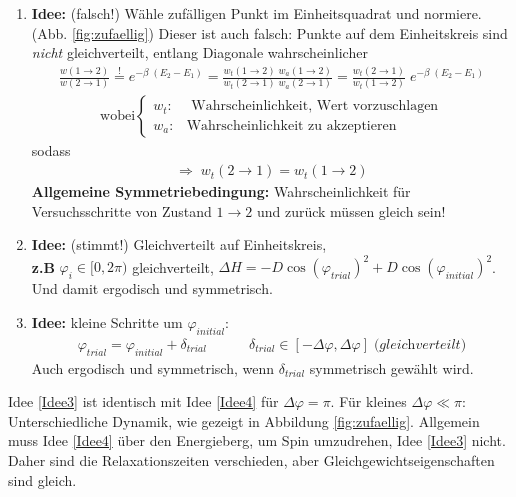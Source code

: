 \documentclass[12pt]{article}
\begin{document}
\begin{enumerate}
\item \textbf{Idee:} (falsch!) Wähle zufälligen Punkt im Einheitsquadrat und normiere. (Abb. \ref{fig:zufaellig})
Dieser ist auch falsch: Punkte auf dem Einheitskreis sind \textit{nicht} gleichverteilt, entlang Diagonale wahrscheinlicher
\begin{align*}
\frac{w(1 \to 2)}{w(2\to 1)} \overset{!}{=} e^{- \beta \; (E_2 - E_1)} = \frac{w_{t} (1 \to 2) \; w_{a} (1 \to 2)}{w_{t} (2 \to 1) \; w_{a} (2 \to 1) }  = \frac{w_t(2 \to 1)}{w_t(1 \to 2)} \; e^{-\beta \; (E_2-E_1)}
\end{align*}
\begin{align*}
\text{wobei} \begin{cases}
w_t: & \text{ Wahrscheinlichkeit, Wert vorzuschlagen} \\
w_a: & \text{Wahrscheinlichkeit zu akzeptieren}
\end{cases}
\end{align*}
sodass \begin{align*}
\Rightarrow \; w_t(2\to 1) = w_t(1 \to 2)
\end{align*}
\textbf{Allgemeine Symmetriebedingung:} Wahrscheinlichkeit für Versuchsschritte von Zustand $1 \to 2$ und zurück müssen gleich sein!

\item \textbf{Idee:}\label{Idee3} (stimmt!) Gleichverteilt auf Einheitskreis,\\ \textbf{z.B} $\varphi_i \in [0, 2\pi)$ gleichverteilt, $\Delta H = -D \cos (\varphi_{trial})^2 + D \cos (\varphi_{initial})^2$. \\
Und damit ergodisch und symmetrisch.

\item \textbf{Idee:}\label{Idee4} kleine Schritte um $\varphi_{initial}$: 
\begin{align*}
\varphi_{trial} = \varphi_{initial} + \delta_{trial} \quad \quad \quad \delta_{trial} \in [ - \Delta \varphi, \Delta \varphi ] \; \textit{(gleichverteilt)}
\end{align*}
Auch ergodisch und symmetrisch, wenn $\delta_{trial}$ symmetrisch gewählt wird.
\end{enumerate}

Idee \ref{Idee3} ist identisch mit Idee \ref{Idee4} für $\Delta \varphi = \pi$. Für kleines $\Delta \varphi \ll \pi$: Unterschiedliche Dynamik, wie gezeigt in Abbildung \ref{fig:zufaellig}. Allgemein muss Idee \ref{Idee4} über den Energieberg, um Spin umzudrehen, Idee \ref{Idee3} nicht. Daher sind die Relaxationszeiten verschieden, aber Gleichgewichtseigenschaften sind gleich. 
\end{document}
